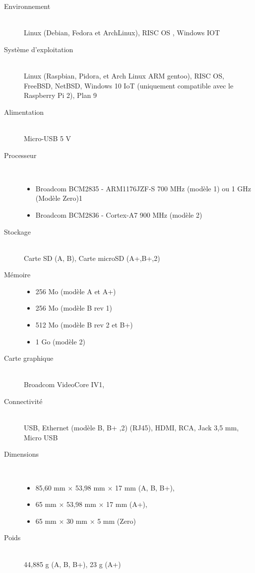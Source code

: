 \begin{description}
	\item[Environnement] \hfill \\ Linux (Debian, Fedora et ArchLinux), RISC OS , Windows IOT
	\item[Système d'exploitation] \hfill \\ Linux (Raspbian, Pidora, et Arch Linux ARM gentoo), RISC OS, FreeBSD, NetBSD, Windows 10 IoT (uniquement compatible avec le Raspberry Pi 2), Plan 9
	\item[Alimentation] \hfill \\ Micro-USB 5 V
	\item[Processeur] \hfill \\
		\begin{itemize}
			\item Broadcom BCM2835 - ARM1176JZF-S 700 MHz (modèle 1) ou 1 GHz (Modèle Zero)1
			\item Broadcom BCM2836 - Cortex-A7 900 MHz (modèle 2)
		\end{itemize}

	\item[Stockage] \hfill \\ Carte SD (A, B), Carte microSD (A+,B+,2)
	\item[Mémoire] 
		\begin{itemize}
			\item 256 Mo (modèle A et A+)
			\item 256 Mo (modèle B rev 1)
			\item 512 Mo (modèle B rev 2 et B+)
			\item 1 Go (modèle 2)
		\end{itemize}

	\item[Carte graphique] \hfill \\ Broadcom VideoCore IV1,
	\item[Connectivité] \hfill \\ USB, Ethernet (modèle B, B+ ,2) (RJ45), HDMI, RCA, Jack 3,5 mm, Micro USB
	\item[Dimensions] \hfill \\ 
		\begin{itemize}
			\item 85,60 mm × 53,98 mm × 17 mm (A, B, B+),
			\item 65 mm × 53,98 mm × 17 mm (A+),
			\item 65 mm × 30 mm × 5 mm (Zero)
		\end{itemize}
	\item[Poids] \hfill \\ 44,885 g (A, B, B+), 23 g (A+)
\end{description}

